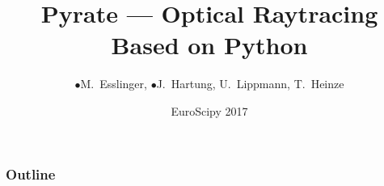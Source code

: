 \documentclass[
10pt,
]{beamer}
\title[Pyrate -- Raytracing in Python]{Pyrate --- Optical Raytracing Based on Python}
\author[M. Esslinger, J. Hartung, U. Lippmann, T. Heinze]{$\bullet$M.~Esslinger, $\bullet$J.~Hartung, U.~Lippmann, T.~Heinze}
\date[EuroScipy 2017]{EuroScipy 2017}
\begin{document}
\begin{frame}
\titlepage
\end{frame}

\begin{frame}
 \frametitle{Outline}
 \tableofcontents
\end{frame}
\end{document}
